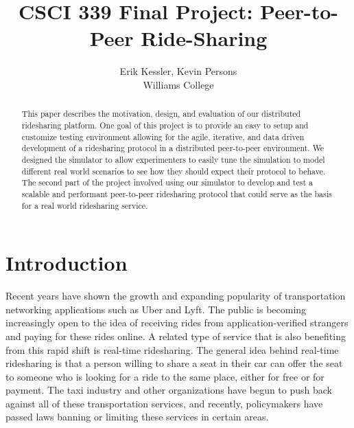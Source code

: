 \documentclass[letterpaper,11pt,twocolumn]{article}
\begin{document}
\title{CSCI 339 Final Project: Peer-to-Peer Ride-Sharing} 
\date{}

\author{
  {\rm Erik Kessler, Kevin Persons}\\
       Williams College\\
}

\maketitle

\thispagestyle{empty}
                                   
\begin{abstract}
This paper describes the motivation, design, and evaluation of our distributed ridesharing platform. One goal of this project is to provide an easy to setup and customize testing environment allowing for the agile, iterative, and data driven development of a ridesharing protocol in a distributed peer-to-peer environment. We designed the simulator to allow experimenters to easily tune the simulation to model different real world scenarios to see how they should expect their protocol to behave. The second part of the project involved using our simulator to develop and test a scalable and performant peer-to-peer ridesharing  protocol that could serve as the basis for a real world ridesharing service.
\end{abstract}

\section{Introduction}
Recent years have shown the growth and expanding popularity of transportation networking applications such as Uber and Lyft. The public is becoming increasingly open to the idea of receiving rides from application-verified strangers and paying for these rides online. A related type of service that is also benefiting from this rapid shift is real-time ridesharing. The general idea behind real-time ridesharing is that a person willing to share a seat in their car can offer the seat to someone who is looking for a ride to the same place, either for free or for payment. The taxi industry and other organizations have begun to push back against all of these transportation services, and recently, policymakers have passed laws banning or limiting these services in certain areas.
\end{document}
